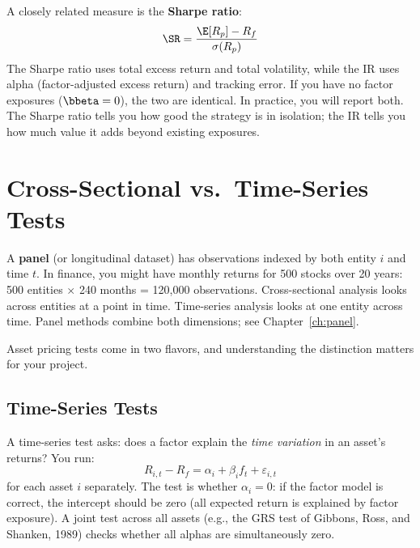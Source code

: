 A closely related measure is the \textbf{Sharpe ratio}:
\begin{equation}
\SR = \frac{\E[R_p] - R_f}{\sigma(R_p)}
\label{eq:sharpe}
\end{equation}
The Sharpe ratio uses total excess return and total volatility, while the IR uses alpha (factor-adjusted excess return) and tracking error. If you have no factor exposures ($\bbeta = 0$), the two are identical. In practice, you will report both. The Sharpe ratio tells you how good the strategy is in isolation; the IR tells you how much value it adds beyond existing exposures.

\section{Cross-Sectional vs.\ Time-Series Tests}
\label{sec:cs-vs-ts}

\begin{prereq}
A \textbf{panel} (or longitudinal dataset) has observations indexed by both entity $i$ and time $t$. In finance, you might have monthly returns for 500 stocks over 20 years: 500 entities $\times$ 240 months = 120{,}000 observations. Cross-sectional analysis looks across entities at a point in time. Time-series analysis looks at one entity across time. Panel methods combine both dimensions; see Chapter~\ref{ch:panel}.
\end{prereq}

Asset pricing tests come in two flavors, and understanding the distinction matters for your project.

\subsection{Time-Series Tests}

A time-series test asks: does a factor explain the \emph{time variation} in an asset's returns? You run:
\begin{equation}
R_{i,t} - R_f = \alpha_i + \beta_i f_t + \varepsilon_{i,t}
\label{eq:ts-test}
\end{equation}
for each asset $i$ separately. The test is whether $\alpha_i = 0$: if the factor model is correct, the intercept should be zero (all expected return is explained by factor exposure). A joint test across all assets (e.g., the GRS test of Gibbons, Ross, and Shanken, 1989) checks whether all alphas are simultaneously zero.

